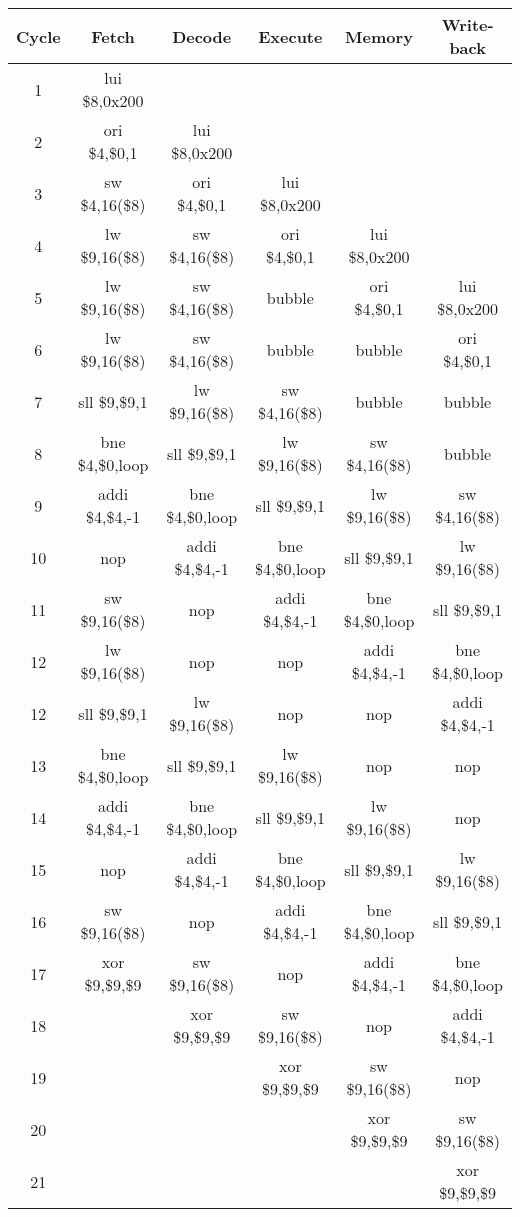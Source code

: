 \documentclass[11pt,reqno]{article}
\begin{document}
\begin{tabular}{| c | c | c | c | c | c |}
\hline
Cycle & Fetch & Decode & Execute & Memory & Write-back \\ \hline
1 & lui \$8,0x200 & & & & \\ \hline
2 & ori \$4,\$0,1 & lui \$8,0x200 & & & \\ \hline
3 & sw \$4,16(\$8) & ori \$4,\$0,1 & lui \$8,0x200 & & \\ \hline
4 & lw \$9,16(\$8) & sw \$4,16(\$8) & ori \$4,\$0,1 & lui \$8,0x200 & \\ \hline
5 & lw \$9,16(\$8) & sw \$4,16(\$8) & bubble & ori \$4,\$0,1 & lui \$8,0x200 \\ \hline
6 & lw \$9,16(\$8) & sw \$4,16(\$8) & bubble & bubble & ori \$4,\$0,1 \\ \hline
7 & sll \$9,\$9,1 & lw \$9,16(\$8) & sw \$4,16(\$8) & bubble & bubble \\ \hline
8 & bne \$4,\$0,loop & sll \$9,\$9,1 & lw \$9,16(\$8) & sw \$4,16(\$8) & bubble \\ \hline
9 & addi \$4,\$4,-1 & bne \$4,\$0,loop & sll \$9,\$9,1 & lw \$9,16(\$8) & sw \$4,16(\$8) \\ \hline
10 & nop & addi \$4,\$4,-1 & bne \$4,\$0,loop & sll \$9,\$9,1 & lw \$9,16(\$8) \\ \hline
11 & sw \$9,16(\$8) & nop & addi \$4,\$4,-1 & bne \$4,\$0,loop & sll \$9,\$9,1 \\ \hline
12 &  lw \$9,16(\$8) & nop & nop & addi \$4,\$4,-1 & bne \$4,\$0,loop \\ \hline
12 & sll \$9,\$9,1 & lw \$9,16(\$8) & nop & nop & addi \$4,\$4,-1 \\ \hline
13 & bne \$4,\$0,loop & sll \$9,\$9,1 & lw \$9,16(\$8) & nop & nop \\ \hline
14 & addi \$4,\$4,-1 & bne \$4,\$0,loop & sll \$9,\$9,1 & lw \$9,16(\$8) & nop \\ \hline
15 & nop & addi \$4,\$4,-1 & bne \$4,\$0,loop & sll \$9,\$9,1 & lw \$9,16(\$8) \\ \hline
16 & sw \$9,16(\$8) & nop & addi \$4,\$4,-1 & bne \$4,\$0,loop & sll \$9,\$9,1 \\ \hline
17 & xor \$9,\$9,\$9 & sw \$9,16(\$8) & nop & addi \$4,\$4,-1 & bne \$4,\$0,loop \\ \hline
18 & & xor \$9,\$9,\$9 & sw \$9,16(\$8) & nop & addi \$4,\$4,-1 \\ \hline
19 & & & xor \$9,\$9,\$9 & sw \$9,16(\$8) & nop \\ \hline
20 & & & & xor \$9,\$9,\$9 & sw \$9,16(\$8) \\ \hline
21 & & & & & xor \$9,\$9,\$9 \\ \hline
\end{tabular}
\end{document}
